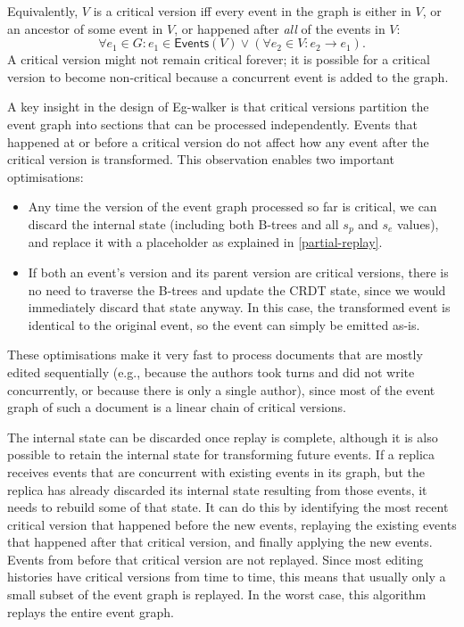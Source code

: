 \documentclass[sigplan,10pt]{acmart}
\newcommand{\algname}{Eg-walker\xspace}
\begin{document}
Equivalently, $V$ is a critical version iff every event in the graph is either in $V$, or an ancestor of some event in $V$, or happened after \emph{all} of the events in $V$:
\begin{equation*}
  \forall e_1 \in G: e_1 \in \mathsf{Events}(V) \vee (\forall e_2 \in V: e_2 \rightarrow e_1).
\end{equation*}
A critical version might not remain critical forever; it is possible for a critical version to become non-critical because a concurrent event is added to the graph.

A key insight in the design of \algname is that critical versions partition the event graph into sections that can be processed independently. Events that happened at or before a critical version do not affect how any event after the critical version is transformed. %
This observation enables two important optimisations:

\begin{itemize}
\item Any time the version of the event graph processed so far is critical, we can discard the internal state (including both B-trees and all $s_p$ and $s_e$ values), and replace it with a placeholder as explained in \autoref{partial-replay}.
\item If both an event's version and its parent version are critical versions, there is no need to traverse the B-trees and update the CRDT state, since we would immediately discard that state anyway. In this case, the transformed event is identical to the original event, so the event can simply be emitted as-is.
\end{itemize}

These optimisations make it very fast to process documents that are mostly edited sequentially (e.g., because the authors took turns and did not write concurrently, or because there is only a single author), since most of the event graph of such a document is a linear chain of critical versions.

The internal state can be discarded once replay is complete, although it is also possible to retain the internal state for transforming future events.
If a replica receives events that are concurrent with existing events in its graph, but the replica has already discarded its internal state resulting from those events, it needs to rebuild some of that state.
It can do this by identifying the most recent critical version that happened before the new events, replaying the existing events that happened after that critical version, and finally applying the new events.
Events from before that critical version are not replayed.
Since most editing histories have critical versions from time to time, this means that usually only a small subset of the event graph is replayed.
In the worst case, this algorithm replays the entire event graph.
\end{document}
